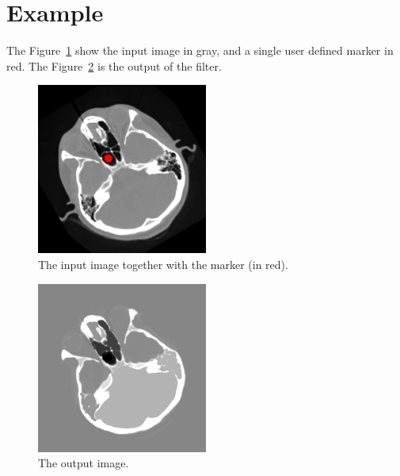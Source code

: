 \documentclass[IJ]{cesj}
\begin{document}
\section{Example}
The Figure~\ref{input} show the input image in gray, and a single user defined marker in red. The Figure~\ref{output} is the output of the filter.

\begin{figure}[hb]
\centering
\includegraphics[width=0.5\textwidth]{cthead1}
\caption{The input image together with the marker (in red).\label{input}}
\end{figure}

\begin{figure}[hb]
\centering
\includegraphics[width=0.5\textwidth]{test}
\caption{The output image.\label{output}}
\end{figure}
\end{document}

